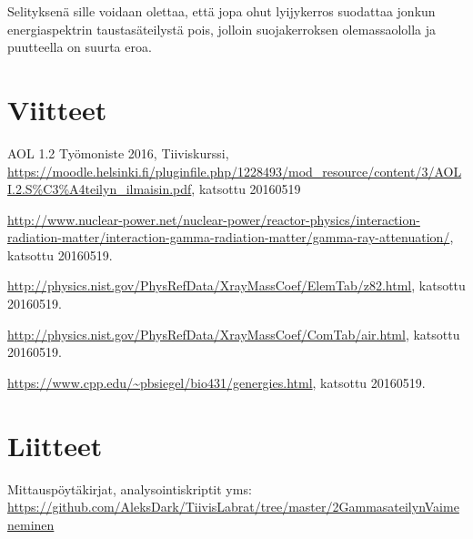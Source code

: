 \documentclass[a4paper, 12pt]{article}
\begin{document}
Selityksenä sille voidaan olettaa, että jopa ohut lyijykerros suodattaa jonkun energiaspektrin taustasäteilystä pois, jolloin suojakerroksen olemassaololla ja puutteella on suurta eroa.

\clearpage
\section{Viitteet}

\begin{thebibliography}{1}

 AOL 1.2 Työmoniste 2016, Tiiviskurssi, \url{https://moodle.helsinki.fi/pluginfile.php/1228493/mod_resource/content/3/AOLI.2.S%C3%A4teilyn_ilmaisin.pdf}, katsottu 20160519

 \url{http://www.nuclear-power.net/nuclear-power/reactor-physics/interaction-radiation-matter/interaction-gamma-radiation-matter/gamma-ray-attenuation/}, katsottu 20160519. 

 \url{http://physics.nist.gov/PhysRefData/XrayMassCoef/ElemTab/z82.html}, katsottu 20160519.

 \url{http://physics.nist.gov/PhysRefData/XrayMassCoef/ComTab/air.html}, katsottu 20160519.

 \url{https://www.cpp.edu/~pbsiegel/bio431/genergies.html}, katsottu 20160519.

\end{thebibliography}

\section{Liitteet}
Mittauspöytäkirjat, analysointiskriptit yms:
\url{https://github.com/AleksDark/TiivisLabrat/tree/master/2GammasateilynVaimeneminen}
\end{document}
